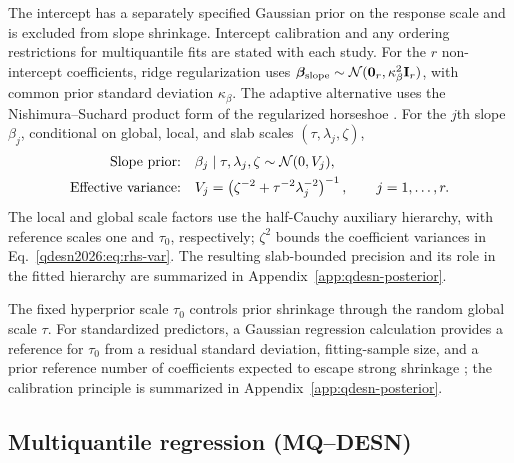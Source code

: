 The intercept has a separately specified Gaussian prior on the response scale
and is excluded from slope shrinkage. Intercept calibration and any ordering
restrictions for multiquantile fits are stated with each study. For the \(r\)
non-intercept
coefficients, ridge regularization uses
\(\boldsymbol{\beta}_{\mathrm{slope}}\sim
\mathcal{N}(\boldsymbol{0}_{r},\kappa_\beta^2\mathbf{I}_{r})\), with common prior standard
deviation \(\kappa_\beta\). The adaptive alternative uses the
Nishimura--Suchard product form of the regularized horseshoe
\citep{qdesn-MakalicSchmidt2016SimpleSampler,exd-nishimura2023shrunken}. For the
\(j\)th slope \(\beta_j\), conditional on global, local, and slab scales
\((\tau,\lambda_j,\zeta)\),
\begin{equation}
\begin{aligned}
\text{Slope prior:}\quad
&\beta_j\mid\tau,\lambda_j,\zeta\sim\mathcal{N}(0,V_j),\\
\text{Effective variance:}\quad
&V_j=\left(\zeta^{-2}+\tau^{-2}\lambda_j^{-2}\right)^{-1},
\qquad j=1,\ldots,r.
\end{aligned}
\label{qdesn2026:eq:rhs-var}
\end{equation}
The local and global scale factors use the half-Cauchy auxiliary hierarchy,
with reference scales one and \(\tau_0\), respectively; \(\zeta^2\) bounds the
coefficient variances in Eq.~\eqref{qdesn2026:eq:rhs-var}. The resulting
slab-bounded precision and its role in the fitted hierarchy are summarized in
Appendix~\ref{app:qdesn-posterior}.

The fixed hyperprior scale \(\tau_0\) controls prior shrinkage through the
random global scale \(\tau\). For standardized predictors, a Gaussian
regression calculation provides a reference for \(\tau_0\) from a residual standard
deviation, fitting-sample size, and a prior reference number of coefficients
expected to escape strong shrinkage \citep{qdesn-PiironenVehtari2017RHS}; the
calibration principle is summarized in
Appendix~\ref{app:qdesn-posterior}.

\subsection{Multiquantile regression (MQ--DESN)}
\label{qdesn2026:subsec:joint-qdesn}

